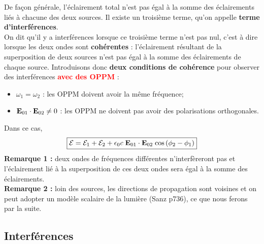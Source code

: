 \documentclass[11pt,a4paper]{report}
\begin{document}
De façon générale, l'éclairement total n'est pas égal à la somme des éclairements liés à chacune des deux sources. Il existe un troisième terme, qu'on appelle \textbf{terme d'interférences}.\\

On dit qu'il y a interférences lorsque ce troisième terme n'est pas nul, c'est à dire lorsque les deux ondes sont \textbf{cohérentes} : l'éclairement résultant de la superposition de deux sources n'est pas égal à la somme des éclairements de chaque source. Introduisons donc \textbf{deux conditions de cohérence} pour observer des interférences \textbf{\textcolor{red}{avec des OPPM}} :
\begin{itemize}
	\item $\omega_1 = \omega_2$ : les OPPM doivent avoir la même fréquence; 
	\item $\bold{E}_{01}\cdot\bold{E}_{02} \neq 0$ : les OPPM ne doivent pas avoir des 						polarisations orthogonales.\\
\end{itemize}

Dans ce cas,
\begin{equation}
	\boxed{\mathcal{E} = 
	\mathcal{E}_1 + \mathcal{E}_2 
	+ \epsilon_0 c \;\bold{E}_{01}\cdot\bold{E}_{02}\;\text{cos}\left(\phi_2-\phi_1\right)}
\end{equation}
\textbf{Remarque 1 :} deux ondes de fréquences différentes n'interfèreront pas et l'éclairement lié à la superposition de ces deux ondes sera égal à la somme des éclairements.\\
\textbf{Remarque 2 :} loin des sources, les directions de propagation sont voisines et on peut adopter un modèle scalaire de la lumière (Sanz p736), ce que nous ferons par la suite.\\

\subsection{Interférences}
\end{document}
